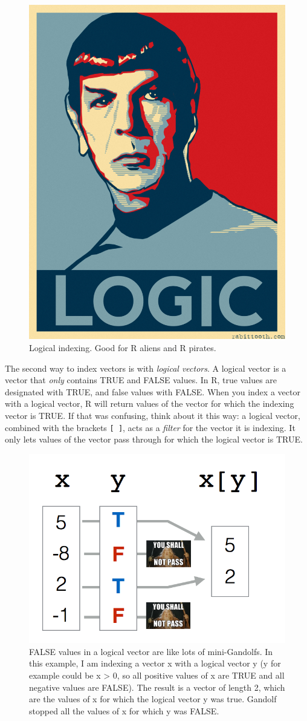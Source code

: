 \documentclass[]{book}
\theoremstyle{definition}
\theoremstyle{definition}
\theoremstyle{remark}
\begin{document}
\begin{figure}

{\centering \includegraphics[width=0.5\linewidth]{images/logic} 

}

\caption{Logical indexing. Good for R aliens and R pirates.}\label{fig:unnamed-chunk-8}
\end{figure}

The second way to index vectors is with \emph{logical vectors}. A
logical vector is a vector that \emph{only} contains TRUE and FALSE
values. In R, true values are designated with TRUE, and false values
with FALSE. When you index a vector with a logical vector, R will return
values of the vector for which the indexing vector is TRUE. If that was
confusing, think about it this way: a logical vector, combined with the
brackets \texttt{{[}\ {]}}, acts as a \emph{filter} for the vector it is
indexing. It only lets values of the vector pass through for which the
logical vector is TRUE.

\begin{figure}

{\centering \includegraphics[width=0.5\linewidth]{images/indexgandolf} 

}

\caption{FALSE values in a logical vector are like lots of mini-Gandolfs. In this example, I am indexing a vector x with a logical vector y (y for example could be x > 0, so all positive values of x are TRUE and all negative values are FALSE). The result is a vector of length 2, which are the values of x for which the logical vector y was true. Gandolf stopped all the values of x for which y was FALSE.}\label{fig:unnamed-chunk-9}
\end{figure}
\end{document}
